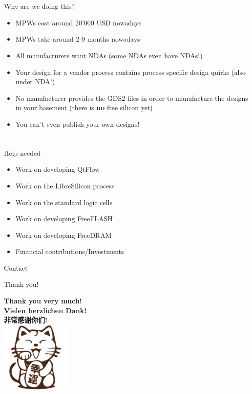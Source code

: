 \documentclass[9pt]{beamer}
\begin{document}
\section[Why]{}
\begin{frame}{Why are we doing this?}
	\begin{itemize}
		\item MPWs cost around 20'000 USD nowadays
		\item MPWs take around 2-9 months nowadays
		\item All manufacturers want NDAs (some NDAs even have NDAs!)
		\item Your design for a vendor process contains process specific design quirks (also under NDA!)
		\item No manufacturer provides the GDS2 files in order to manufacture the designs in your basement (there is \textbf{no} free silicon yet)
		\item You can't even publish your own designs!
	\end{itemize}
\end{frame}

\section[Conclusion]{}

\begin{frame}{Help needed}
	\begin{itemize}
		\item Work on developing QtFlow\footnotemark
		\item Work on the LibreSilicon process\footnotemark
		\item Work on the standard logic cells
		\item Work on developing FreeFLASH
		\item Work on developing FreeDRAM
		\item Financial contributions/Investments
	\end{itemize}

\end{frame}

\begin{frame}{Contact}
	
\end{frame}

\begin{frame}{Thank you!}
	\begin{center}
		\textbf{Thank you very much!} \\
		\textbf{Vielen herzlichen Dank!} \\
		\textbf{\cjkfont 非常感谢你们!} \\
		\includegraphics[width=100pt]{cat.png}
	\end{center}
\end{frame}
\end{document}
